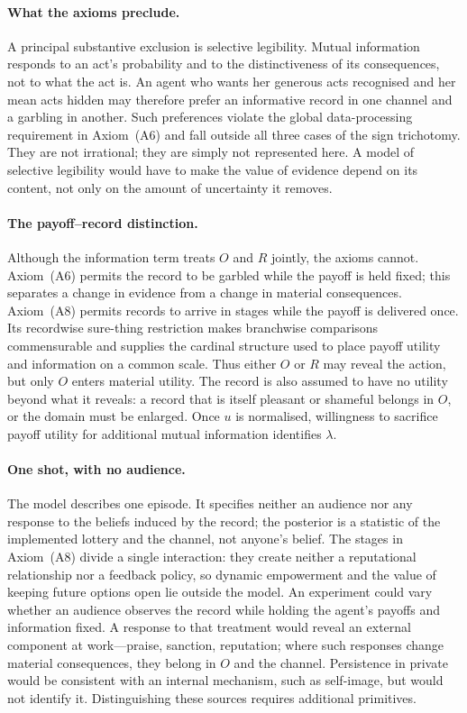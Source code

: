 \documentclass[11pt,a4paper]{article}
\theoremstyle{definition}
\newcommand{\1}{\mathbf 1}
\begin{document}
\paragraph{What the axioms preclude.}
A principal substantive exclusion is selective legibility.  Mutual information responds to an act's
probability and to the distinctiveness of its consequences, not to what the act is.  An agent who wants her generous
acts recognised and her mean acts hidden may therefore prefer an informative record in one channel and a garbling
in another.  Such preferences violate the global data-processing requirement in Axiom~\textup{(A6)} and fall
outside all three cases of the sign trichotomy.  They are not irrational; they are simply not represented here.
A model of selective legibility would have to make the value of evidence depend on its content, not only on the
amount of uncertainty it removes.

\paragraph{The payoff--record distinction.}
Although the information term treats $O$ and $R$ jointly, the axioms cannot.  Axiom~\textup{(A6)} permits the
record to be garbled while the payoff is held fixed; this separates a change in evidence from a change in material
consequences.  Axiom~\textup{(A8)} permits records to arrive in stages while the payoff is delivered once.  Its
recordwise sure-thing restriction makes branchwise comparisons commensurable and supplies the cardinal structure used to
place payoff utility and information on a common scale.  Thus either $O$ or $R$ may reveal the action, but only
$O$ enters material utility.  The record is also assumed to have no utility beyond what it reveals: a record
that is itself pleasant or shameful belongs in $O$, or the domain must be enlarged.  Once $u$ is normalised,
willingness to sacrifice payoff utility for additional mutual information identifies $\lambda$.

\paragraph{One shot, with no audience.}
The model describes one episode.  It specifies neither an audience nor any response to the beliefs induced by
the record; the posterior is a statistic of the implemented lottery and the channel, not anyone's belief.  The stages in
Axiom~\textup{(A8)} divide a single interaction: they create neither a reputational relationship nor a feedback
policy, so dynamic empowerment and the value of keeping future options open lie outside the model.  An
experiment could vary whether an audience observes the record while holding the agent's payoffs and information
fixed.  A response to that treatment would reveal an external component at work---praise, sanction, reputation;
where such responses change material consequences, they belong in $O$ and the channel.  Persistence in private
would be consistent with an internal mechanism, such as self-image, but would not identify it.  Distinguishing
these sources requires additional primitives.
\end{document}
